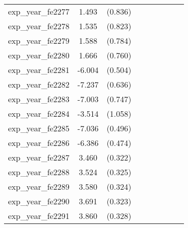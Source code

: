 {\begin{tabular}{l*{4}{cc}}
exp\_year\_fe2277&    1.493         &  (0.836)&                  &         &                  &         &                  &         \\
exp\_year\_fe2278&    1.535         &  (0.823)&                  &         &                  &         &                  &         \\
exp\_year\_fe2279&    1.588\sym{*}  &  (0.784)&                  &         &                  &         &                  &         \\
exp\_year\_fe2280&    1.666\sym{*}  &  (0.760)&                  &         &                  &         &                  &         \\
exp\_year\_fe2281&   -6.004\sym{***}&  (0.504)&                  &         &                  &         &                  &         \\
exp\_year\_fe2282&   -7.237\sym{***}&  (0.636)&                  &         &                  &         &                  &         \\
exp\_year\_fe2283&   -7.003\sym{***}&  (0.747)&                  &         &                  &         &                  &         \\
exp\_year\_fe2284&   -3.514\sym{***}&  (1.058)&                  &         &                  &         &                  &         \\
exp\_year\_fe2285&   -7.036\sym{***}&  (0.496)&                  &         &                  &         &                  &         \\
exp\_year\_fe2286&   -6.386\sym{***}&  (0.474)&                  &         &                  &         &                  &         \\
exp\_year\_fe2287&    3.460\sym{***}&  (0.322)&                  &         &                  &         &                  &         \\
exp\_year\_fe2288&    3.524\sym{***}&  (0.325)&                  &         &                  &         &                  &         \\
exp\_year\_fe2289&    3.580\sym{***}&  (0.324)&                  &         &                  &         &                  &         \\
exp\_year\_fe2290&    3.691\sym{***}&  (0.323)&                  &         &                  &         &                  &         \\
exp\_year\_fe2291&    3.860\sym{***}&  (0.328)&                  &         &                  &         &                  &         \\

\end{tabular}}
